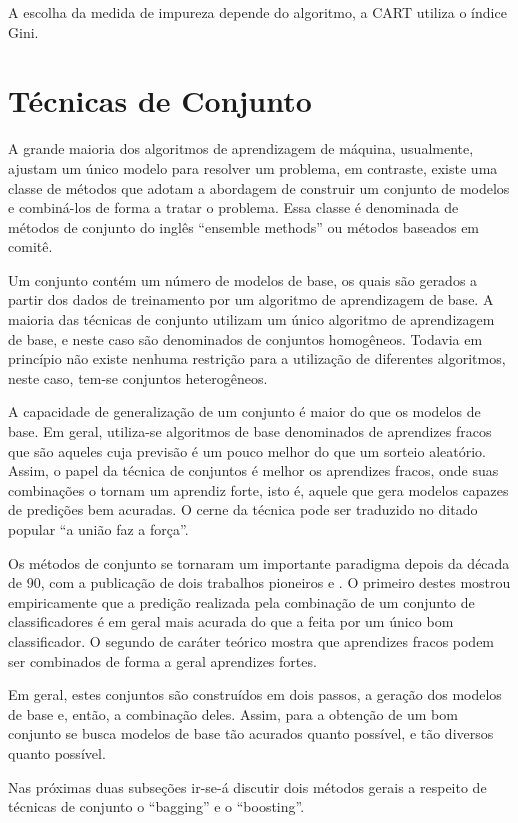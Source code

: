 A escolha da medida de impureza depende do algoritmo, a CART utiliza o índice Gini.

\section{Técnicas de Conjunto}

A grande maioria dos algoritmos de aprendizagem de máquina, usualmente, ajustam um único modelo para resolver um problema, em contraste, existe uma classe de métodos que adotam a abordagem de construir um conjunto de modelos e combiná-los de forma a tratar o problema. Essa classe é denominada de métodos de conjunto do inglês ``ensemble methods'' ou métodos baseados em comitê.

Um conjunto contém um número de modelos de base, os quais são gerados a partir dos dados de treinamento por um algoritmo de aprendizagem de base. A maioria das técnicas de conjunto utilizam um único algoritmo de aprendizagem de base, e neste caso são denominados de conjuntos homogêneos. Todavia em princípio não existe nenhuma restrição para a utilização de diferentes algoritmos, neste caso, tem-se conjuntos heterogêneos.

A capacidade de generalização de um conjunto é maior do que os modelos de base. Em geral, utiliza-se algoritmos de base denominados de aprendizes fracos que são aqueles cuja previsão é um pouco melhor do que um sorteio aleatório. Assim, o papel da técnica de conjuntos é melhor os aprendizes fracos, onde suas combinações o tornam um aprendiz forte, isto é, aquele que gera modelos capazes de predições bem acuradas. O cerne da técnica pode ser traduzido no ditado popular ``a união faz a força''.

Os métodos de conjunto se tornaram um importante paradigma depois da década de 90, com a publicação de dois trabalhos pioneiros \cite{HANSEN:1990} e \cite{SCHAPIRE:1990}. O primeiro destes mostrou empiricamente que a predição realizada pela combinação de um conjunto de classificadores é em geral mais acurada do que a feita por um único bom classificador. O segundo de caráter teórico mostra que aprendizes fracos podem ser combinados de forma a geral aprendizes fortes. 

Em geral, estes conjuntos são construídos em dois passos, a geração dos modelos de base e, então, a combinação deles. Assim, para a obtenção de um bom conjunto se busca modelos de base tão acurados quanto possível, e tão diversos quanto possível. 

Nas próximas duas subseções ir-se-á discutir dois métodos gerais a respeito de técnicas de conjunto o ``bagging'' e o ``boosting''.

